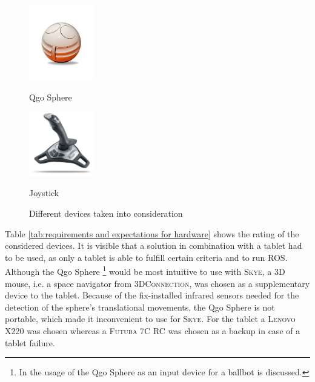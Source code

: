 \begin{figure}[h]
{\begin{center}
			\vspace{0.005\textwidth}
			\hspace{0.05\textwidth}			
			\parbox[b]{0.25\textwidth}{\includegraphics[width=0.25\textwidth]{qgo_sphere_cut}
			\begin{center}Qgo Sphere \end{center}}
			\hspace{0.05\textwidth}
			\parbox[b]{0.25\textwidth}{\includegraphics[width=0.25\textwidth]{Logitech-Freedom-Cordless-Joystick}
			\begin{center}Joystick \end{center}}
			\caption[Different devices taken into consideration]{Different devices taken into consideration}
			\label{fig:devices taken into consideration}	
		\end{center}
	}			
	\vspace{4.5mm}
\end{figure}

Table \ref{tab:requirements and expectations for hardware} shows the rating of the considered devices. It is visible that a solution in combination with a tablet had to be used, as only a tablet is able to fulfill certain criteria and to run \textsc{ROS}. Although the Qgo Sphere \footnote{In  \cite{kammermann} the usage of the Qgo Sphere as an input device for a ballbot is discussed.} would be most intuitive to use with \textsc{Skye}, a 3D mouse, i.e. a space navigator from \textsc{3DConnection}, was chosen as a supplementary device to the tablet. Because of the fix-installed infrared sensors needed for the detection of the sphere's translational movements, the Qgo Sphere is not portable, which made it inconvenient to use for \textsc{Skye}. For the tablet a \textsc{Lenovo} X220 was chosen whereas a \textsc{Futuba} 7C RC was chosen as a backup in case of a tablet failure.


